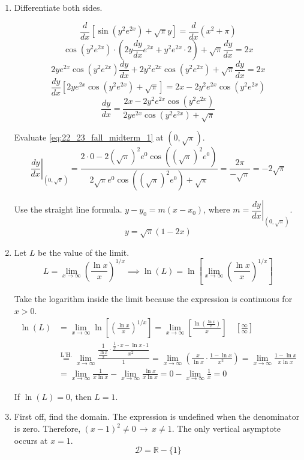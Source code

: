 \documentclass[a4paper, 12pt]{article}
\begin{document}
\begin{enumerate}[leftmargin=*,label=\textbf{\arabic*.}]
\item Differentiate both sides.

\[\frac d{dx}\left[\sin(y^2 e^{2x})+\sqrt\pi y\right]=\frac{d}{dx}\left(x^2+\pi\right)\]
\[\cos\left(y^2 e^{2x}\right)\cdot\left(2y{\frac{dy}{dx} e^{2x}}+y^2 e^{2x}\cdot2\right)+\sqrt\pi\frac{dy}{dx}=2x\]
\[2y{ e^{2x}}\cos\left(y^2 e^{2x}\right)\frac{dy}{dx}+2y^2 e^{2x}\cos\left(y^2 e^{2x}\right)+\sqrt\pi\frac{dy}{dx}=2x\]
\[\frac{dy}{dx}\left[2y e^{2x}\cos\left(y^2 e^{2x}\right)+\sqrt\pi\right]=2x-2y^2{ e^{2x}}\cos\left(y^2 e^{2x}\right)\]
\begin{equation}\frac{dy}{dx}=\frac{2x-2y^2{ e^{2x}}\cos\left(y^2 e^{2x}\right)}{2y e^{2x}\cos\left(y^2 e^{2x}\right)+\sqrt\pi}\label{eq:22_23_fall_midterm_1}\end{equation}

Evaluate \eqref{eq:22_23_fall_midterm_1} at $\left(0, \sqrt\pi\right)$.
\[\left.\frac{dy}{dx}\right|_{\left(0, \sqrt\pi\right)}=\frac{2\cdot0-2\left(\sqrt\pi\right)^2{ e^{0}}\cos\left(\left(\sqrt\pi\right)^2 e^{0}\right)}{2\sqrt\pi e^{0}\cos\left(\left(\sqrt\pi\right)^2 e^{0}\right)+\sqrt\pi}=\frac{2\pi}{-\sqrt\pi}=-2\sqrt\pi\]

Use the straight line formula. $y-y_0=m(x-x_0)$, where $m=\left.\dfrac{dy}{dx}\right|_{\left(0,\sqrt\pi\right)}$.
\[\boxed{y=\sqrt\pi(1-2x)}\]

\item Let $L$ be the value of the limit.
\[L=\lim_{x\to\infty}\left(\frac{\ln x}x\right)^{1/x}\implies\ln(L)=\ln\left[\lim_{x\to\infty}\left(\frac{\ln x}x\right)^{1/x}\right]\]

Take the logarithm inside the limit because the expression is continuous for $x>0$.
\begin{align*}\ln(L)&=\lim_{x\to\infty}\ln\left[\left(\frac{\ln x}x\right)^{1/x}\right]=\lim_{x\to \infty}\left[\frac{\ln\left(\frac{\ln x}x\right)}x\right]\quad\left[\frac\infty\infty\right]\\[1em]&\overset{\text{L'H.}}{=}\lim_{x\to\infty} \frac{\dfrac1{\frac{\ln x}{x}}\cdot\dfrac{\frac1x\cdot x-\ln x\cdot1}{x^2}}{1}=\lim_{x\to\infty}\left({\frac x{\ln x}\cdot\frac{1-\ln x}{x^2}}\right)=\lim_{x\to\infty}\frac{1-\ln x}{x\ln x}\\[1em]&=\lim_{x\to\infty}\frac1{x\ln x}-\lim_{x\to\infty}\frac{\ln x}{x\ln x}=0-\lim_{x\to\infty}\frac1x=0\end{align*}

If $\ln(L) = 0$, then $\boxed{L = 1}$.

\item First off, find the domain. The expression is undefined when the denominator is zero. Therefore, $(x-1)^2\neq0\,\rightarrow\,x\neq1$. The only vertical asymptote occurs at $x = 1$.
\[\mathcal{D}=\mathbb{R}-\{1\}\]


\end{enumerate}
\end{document}

